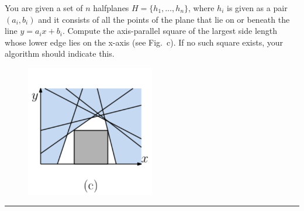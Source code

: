 \documentclass[11pt]{article}
\begin{document}

You are given a set of $n$ halfplanes $H = \{h_1,\ldots,h_n\}$, where
$h_i$ is given as a pair $(a_i,b_i)$ and it consists of all the points
of the plane that lie on or beneath the line $y = a_ix + b_i$. Compute
the axis-parallel square of the largest side length whose lower edge
lies on the x-axis (see Fig.~c). If no such square exists, your
algorithm should indicate this.

\begin{figure}[h]
  \centering
  \includegraphics[width = 0.5\textwidth]{lp_c.png}
\end{figure}

\hrule
\end{document}
